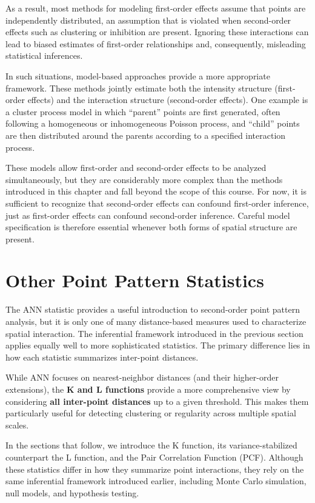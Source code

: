 \documentclass[
  letterpaper,
]{book}
\begin{document}
As a result, most methods for modeling first-order effects assume that
points are independently distributed, an assumption that is violated
when second-order effects such as clustering or inhibition are present.
Ignoring these interactions can lead to biased estimates of first-order
relationships and, consequently, misleading statistical inferences.

In such situations, model-based approaches provide a more appropriate
framework. These methods jointly estimate both the intensity structure
(first-order effects) and the interaction structure (second-order
effects). One example is a cluster process model in which ``parent''
points are first generated, often following a homogeneous or
inhomogeneous Poisson process, and ``child'' points are then distributed
around the parents according to a specified interaction process.

These models allow first-order and second-order effects to be analyzed
simultaneously, but they are considerably more complex than the methods
introduced in this chapter and fall beyond the scope of this course. For
now, it is sufficient to recognize that second-order effects can
confound first-order inference, just as first-order effects can confound
second-order inference. Careful model specification is therefore
essential whenever both forms of spatial structure are present.

\section{Other Point Pattern
Statistics}\label{other-point-pattern-statistics}

The ANN statistic provides a useful introduction to second-order point
pattern analysis, but it is only one of many distance-based measures
used to characterize spatial interaction. The inferential framework
introduced in the previous section applies equally well to more
sophisticated statistics. The primary difference lies in how each
statistic summarizes inter-point distances.

While ANN focuses on nearest-neighbor distances (and their higher-order
extensions), the \textbf{K and L functions} provide a more comprehensive
view by considering \textbf{all inter-point distances} up to a given
threshold. This makes them particularly useful for detecting clustering
or regularity across multiple spatial scales.

In the sections that follow, we introduce the K function, its
variance-stabilized counterpart the L function, and the Pair Correlation
Function (PCF). Although these statistics differ in how they summarize
point interactions, they rely on the same inferential framework
introduced earlier, including Monte Carlo simulation, null models, and
hypothesis testing.
\end{document}
